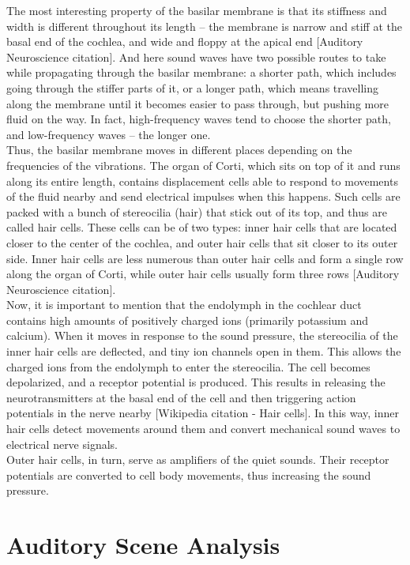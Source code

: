 The most interesting property of the basilar membrane is that its stiffness and width is different throughout its length – the membrane is narrow and stiff at the basal end of the cochlea, and wide and floppy at the apical end [Auditory Neuroscience citation]. And here sound waves have two possible routes to take while propagating through the basilar membrane: a shorter path, which includes going through the stiffer parts of it, or a longer path, which means travelling along the membrane until it becomes easier to pass through, but pushing more fluid on the way. In fact, high-frequency waves tend to choose the shorter path, and low-frequency waves – the longer one.\\

Thus, the basilar membrane moves in different places depending on the frequencies of the vibrations. The organ of Corti, which sits on top of it and runs along its entire length, contains displacement cells able to respond to movements of the fluid nearby and send electrical impulses when this happens. Such cells are packed with a bunch of stereocilia (hair) that stick out of its top, and thus are called hair cells. These cells can be of two types: inner hair cells that are located closer to the center of the cochlea, and outer hair cells that sit closer to its outer side. Inner hair cells are less numerous than outer hair cells and form a single row along the organ of Corti, while outer hair cells usually form three rows [Auditory Neuroscience citation].\\

Now, it is important to mention that the endolymph in the cochlear duct contains high amounts of positively charged ions (primarily potassium and calcium). When it moves in response to the sound pressure, the stereocilia of the inner hair cells are deflected, and tiny ion channels open in them. This allows the charged ions from the endolymph to enter the stereocilia. The cell becomes depolarized, and a receptor potential is produced. This results in releasing the neurotransmitters at the basal end of the cell and then triggering action potentials in the nerve nearby [Wikipedia citation - Hair cells]. In this way, inner hair cells detect movements around them and convert mechanical sound waves to electrical nerve signals.\\

Outer hair cells, in turn, serve as amplifiers of the quiet sounds. Their receptor potentials are converted to cell body movements, thus increasing the sound pressure.

\section{Auditory Scene Analysis}

